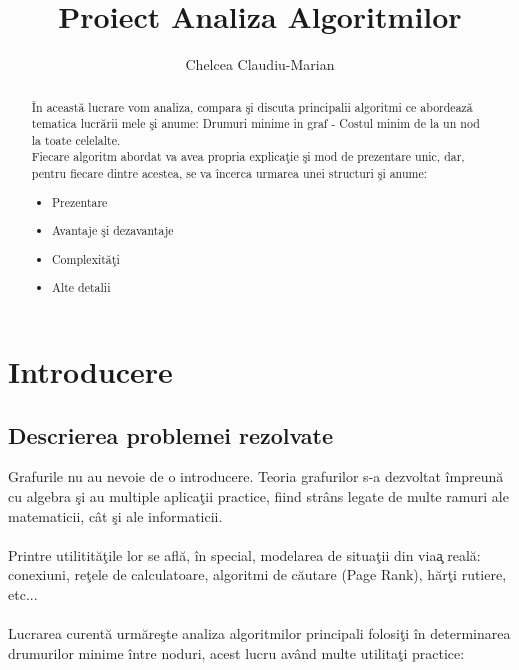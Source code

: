 \documentclass[runningheads]{llncs}
\title{Proiect Analiza Algoritmilor}
\author{Chelcea Claudiu-Marian\orcidID{322CA}}
\institute{Universitatea Politehnica din Bucure\c{s}ti\\Facultatea de Automatic\u{a} \c{s}i Calculatoare\\ \email{claudiuchelcea01@gmail.com}}
\begin{document}
\maketitle             

\begin{abstract}
\^{I}n aceast\u{a} lucrare vom analiza, compara \c{s}i discuta principalii algoritmi ce abordeaz\u{a} tematica lucr\u{a}rii mele \c{s}i anume: Drumuri minime in graf - Costul minim de la un nod la toate celelalte. \\

Fiecare algoritm abordat va avea propria explica\c{t}ie \c{s}i mod de prezentare unic, dar, pentru fiecare dintre acestea, se va \^{i}ncerca urmarea unei structuri \c{s}i anume: \\

\begin{itemize}
	\item Prezentare
	\item Avantaje \c{s}i dezavantaje
	\item Complexit\u{a}\c{t}i
	\item Alte detalii
\end{itemize}

\end{abstract}
%
%
%
%
%
\section{Introducere}
\subsection{Descrierea problemei rezolvate}
\hspace{6pt}Grafurile nu au nevoie de o introducere. Teoria grafurilor s-a dezvoltat \^{i}mpreun\u{a} cu algebra \c{s}i au multiple aplicaţii practice, fiind strâns legate de multe ramuri ale matematicii, c\^{a}t \c{s}i ale informaticii. 
\paragraph{} Printre utilitit\u{a}\c{t}ile lor se afl\u{a}, \^{i}n special, modelarea de situa\c{t}ii din via\c{a} real\u{a}: conexiuni, re\c{t}ele de calculatoare, algoritmi de c\u{a}utare (Page Rank), h\u{a}r\c{t}i rutiere, etc... 

\paragraph{} Lucrarea curent\u{a} urm\u{a}re\c{s}te analiza algoritmilor principali folosi\c{t}i \^{i}n determinarea drumurilor minime \^{i}ntre noduri, acest lucru av\^{a}nd multe utilita\c{t}i practice:
\end{document}
